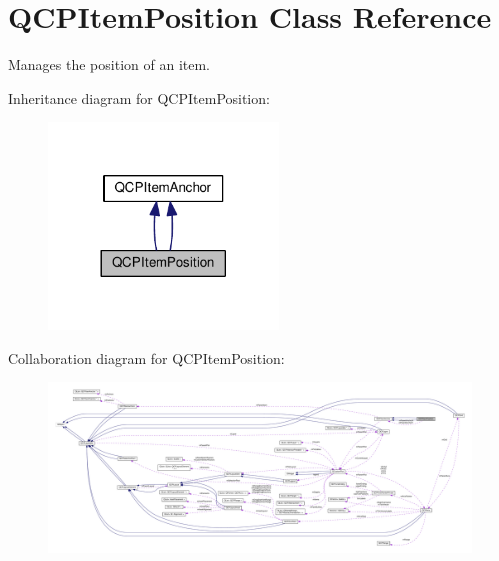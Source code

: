 \hypertarget{class_q_c_p_item_position}{}\section{Q\+C\+P\+Item\+Position Class Reference}
\label{class_q_c_p_item_position}


Manages the position of an item.  




Inheritance diagram for Q\+C\+P\+Item\+Position\+:\nopagebreak
\begin{figure}[H]
\begin{center}
\leavevmode
\includegraphics[width=173pt]{class_q_c_p_item_position__inherit__graph}
\end{center}
\end{figure}


Collaboration diagram for Q\+C\+P\+Item\+Position\+:\nopagebreak
\begin{figure}[H]
\begin{center}
\leavevmode
\includegraphics[width=350pt]{class_q_c_p_item_position__coll__graph}
\end{center}
\end{figure}
